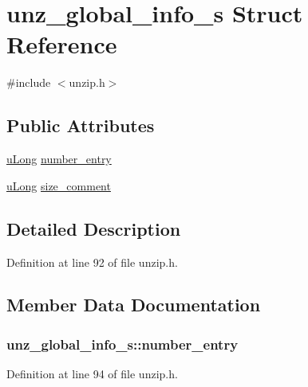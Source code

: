 \hypertarget{structunz__global__info__s}{\section{unz\+\_\+global\+\_\+info\+\_\+s Struct Reference}
\label{structunz__global__info__s}
}


{\ttfamily \#include $<$unzip.\+h$>$}

\subsection*{Public Attributes}
\begin{DoxyCompactItemize}
\item 
\hyperlink{ioapi_8h_a50e9e9d5c30e481de822ad68fe537986}{u\+Long} \hyperlink{structunz__global__info__s_a827d1cd1d09f12acd6c2ee12494cb320}{number\+\_\+entry}
\item 
\hyperlink{ioapi_8h_a50e9e9d5c30e481de822ad68fe537986}{u\+Long} \hyperlink{structunz__global__info__s_a10b58ab57b62301de813ecac0e974363}{size\+\_\+comment}
\end{DoxyCompactItemize}


\subsection{Detailed Description}


Definition at line 92 of file unzip.\+h.



\subsection{Member Data Documentation}
\hypertarget{structunz__global__info__s_a827d1cd1d09f12acd6c2ee12494cb320}{
\subsubsection[{number\+\_\+entry}]{ unz\+\_\+global\+\_\+info\+\_\+s\+::number\+\_\+entry}}\label{structunz__global__info__s_a827d1cd1d09f12acd6c2ee12494cb320}


Definition at line 94 of file unzip.\+h.

